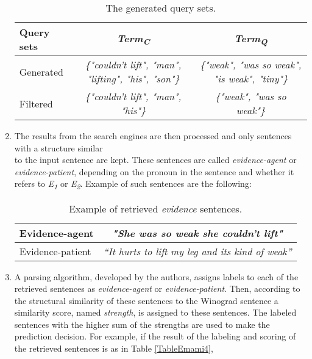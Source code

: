\begin{enumerate}
	\begin{table}[h!]
		\begin{center}
	
		\small
		\begin{tabular}{l|c |c}
			Query sets & \textit{Term\textsubscript{C}} & \textit{Term\textsubscript{Q}}\\\hline
			Generated  & \textit{\{"couldn't lift", "man",  "lifting", "his", "son"\}} &  \textit{\{"weak", "was so weak", "is weak", "tiny"\}}\\\hline
		
		 	Filtered& \textit{\{"couldn't lift", "man", "his"\}} & \textit{\{"weak", "was so weak"\}}
			
		\end{tabular}
		\caption{{\label{TableEmami2}}The generated query sets.}
			
	\end{center}
	\end{table}
	
	\item The results from the search engines are then processed and only sentences with a structure similar \\to the input sentence are kept. 
	These sentences are called \textit{evidence-agent} or \textit{evidence-patient}, depending on the pronoun in the sentence and whether it refers to \textit{E\textsubscript{1}} or \textit{E\textsubscript{2}}. Example of such sentences are the following:
	\begin{table}[h!]
	\begin{center}
	
		\begin{tabular}{l|c }
			Evidence-agent & \textit{"She was so weak she couldn’t lift"}  \\\hline
			Evidence-patient  & \textit{“It hurts to lift my leg and its kind of weak”}
		\end{tabular}
		\caption{{\label{TableEmami3}}Example of retrieved \textit{evidence} sentences.}
		
	\end{center}
	\end{table}
		
	\item A parsing algorithm, developed by the authors, assigns labels to each of the retrieved sentences  as  \textit{evidence-agent} or \textit{evidence-patient}. Then, according to the structural similarity of these sentences to the Winograd sentence a similarity score, named \textit{strength}, is assigned to these sentences. The labeled sentences with the higher sum of the strengths are used to make the prediction decision. For example, if the result of the labeling and scoring of the retrieved sentences is 
	as in Table \ref{TableEmami4}, 
	\begin{table}[h!]
	\begin{center}
				

\end{center}
\end{table}
\end{enumerate}
